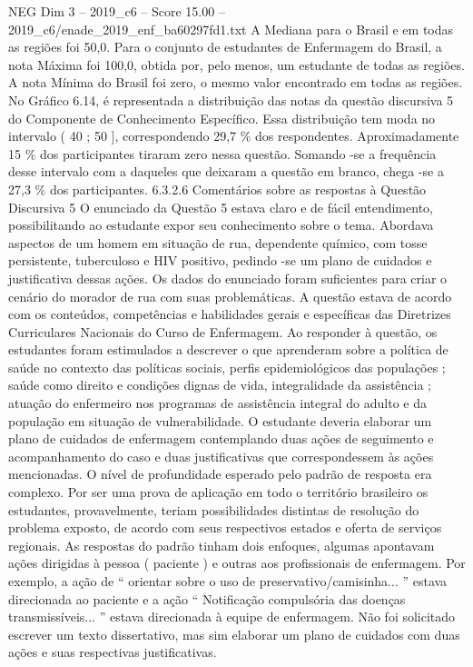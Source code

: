 \begin{textsample}{NEG Dim 3 – 2019\_c6 – Score 15.00 – 2019\_c6/enade\_2019\_enf\_ba60297fd1.txt}
A Mediana para o Brasil e em todas as regiões foi 50,0.
Para o conjunto de estudantes de Enfermagem do Brasil, a nota Máxima foi 100,0, obtida por, pelo menos, um estudante de todas as regiões.
A nota Mínima do Brasil foi zero, o mesmo valor encontrado em todas as regiões.
No Gráfico 6.14, é representada a distribuição das notas da questão discursiva 5 do Componente de Conhecimento Específico.
Essa distribuição tem moda no intervalo ( 40 ; 50 ], correspondendo 29,7 \% dos respondentes.
Aproximadamente 15 \% dos participantes tiraram zero nessa questão.
Somando -se a frequência desse intervalo com a daqueles que deixaram a questão em branco, chega -se a 27,3 \% dos participantes. 6.3.2.6 Comentários sobre as respostas à Questão Discursiva 5 O enunciado da Questão 5 estava claro e de fácil entendimento, possibilitando ao estudante expor seu conhecimento sobre o tema.
Abordava aspectos de um homem em situação de rua, dependente químico, com tosse persistente, tuberculoso e HIV positivo, pedindo -se um plano de cuidados e justificativa dessas ações.
Os dados do enunciado foram suficientes para criar o cenário do morador de rua com suas problemáticas.
A questão estava de acordo com os conteúdos, competências e habilidades gerais e específicas das Diretrizes Curriculares Nacionais do Curso de Enfermagem.
Ao responder à questão, os estudantes foram estimulados a descrever o que aprenderam sobre a política de saúde no contexto das políticas sociais, perfis epidemiológicos das populações ; saúde como direito e condições dignas de vida, integralidade da assistência ; atuação do enfermeiro nos programas de assistência integral do adulto e da população em situação de vulnerabilidade.
O estudante deveria elaborar um plano de cuidados de enfermagem contemplando duas ações de seguimento e acompanhamento do caso e duas justificativas que correspondessem às ações mencionadas.
O nível de profundidade esperado pelo padrão de resposta era complexo.
Por ser uma prova de aplicação em todo o território brasileiro os estudantes, provavelmente, teriam possibilidades distintas de resolução do problema exposto, de acordo com seus respectivos estados e oferta de serviços regionais.
As respostas do padrão tinham dois enfoques, algumas apontavam ações dirigidas à pessoa ( paciente ) e outras aos profissionais de enfermagem.
Por exemplo, a ação de “ orientar sobre o uso de preservativo/camisinha... ” estava direcionada ao paciente e a ação “ Notificação compulsória das doenças transmissíveis... ” estava direcionada à equipe de enfermagem.
Não foi solicitado escrever um texto dissertativo, mas sim elaborar um plano de cuidados com duas ações e suas respectivas justificativas.

\end{textsample}
